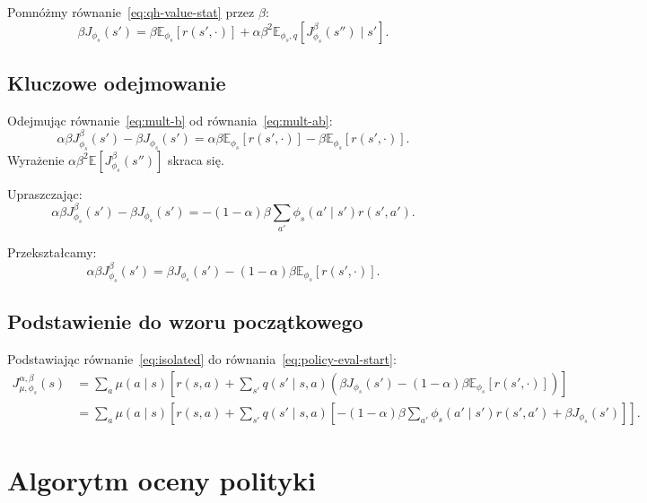 Pomnóżmy równanie~\eqref{eq:qh-value-stat} przez $\beta$:
\begin{equation}
\beta J_{\phi_s}(s') = \beta \mathbb{E}_{\phi_s} [r(s', \cdot)] + \alpha \beta^2 \mathbb{E}_{\phi_s, q} [J^{\beta}_{\phi_s}(s'') \mid s'].
\label{eq:mult-b}
\end{equation}

\subsection{Kluczowe odejmowanie}

Odejmując równanie~\eqref{eq:mult-b} od równania~\eqref{eq:mult-ab}:
\begin{equation}
\alpha \beta J^{\beta}_{\phi_s}(s') - \beta J_{\phi_s}(s') = \alpha \beta \mathbb{E}_{\phi_s} [r(s', \cdot)] - \beta \mathbb{E}_{\phi_s} [r(s', \cdot)].
\end{equation}
Wyrażenie $\alpha \beta^2 \mathbb{E}[J^{\beta}_{\phi_s}(s'')]$ skraca się.

Upraszczając:
\begin{equation}
\alpha \beta J^{\beta}_{\phi_s}(s') - \beta J_{\phi_s}(s') = - (1 - \alpha) \beta \sum_{a'} \phi_s(a'\mid s') r(s', a').
\end{equation}

Przekształcamy:
\begin{equation}
\alpha \beta J^{\beta}_{\phi_s}(s') = \beta J_{\phi_s}(s') - (1 - \alpha) \beta \mathbb{E}_{\phi_s} [r(s', \cdot)].
\label{eq:isolated}
\end{equation}

\subsection{Podstawienie do wzoru początkowego}

Podstawiając równanie~\eqref{eq:isolated} do równania~\eqref{eq:policy-eval-start}:
\begin{align}
J^{\alpha, \beta}_{\mu, \phi_s}(s) &= \sum_a \mu(a\mid s) \left[ r(s, a) + \sum_{s'} q(s'\mid s, a) \left( \beta J_{\phi_s}(s') - (1 - \alpha) \beta \mathbb{E}_{\phi_s} [r(s', \cdot)] \right) \right] \nonumber \\
&= \sum_a \mu(a\mid s) \left[ r(s, a) + \sum_{s'} q(s'\mid s, a) \left[ -(1 - \alpha)\beta \sum_{a'} \phi_s(a'\mid s') r(s', a') + \beta J_{\phi_s}(s') \right] \right].
\label{eq:final-policy-eval}
\end{align}

\section{Algorytm oceny polityki}

